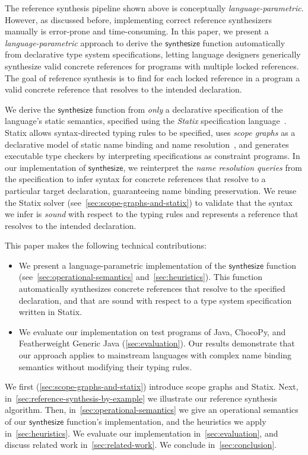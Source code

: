 The reference synthesis pipeline shown above is conceptually \emph{language-parametric}.
However, as discussed before, implementing correct reference synthesizers manually is error-prone and time-consuming.
In this paper, we present a \emph{language-parametric} approach to derive the $\mathsf{synthesize}$ function automatically from declarative type system specifications, letting language designers generically synthesize valid concrete references for programs with multiple locked references.
The goal of reference synthesis is to find for each locked reference in a program a valid concrete reference that resolves to the intended declaration.

We derive the $\mathsf{synthesize}$ function from \emph{only} a declarative specification of the language's static semantics, specified using the \emph{Statix} specification language~\cite{AntwerpenPRV18,RouvoetAPKV20}.
Statix allows syntax-directed typing rules to be specified, uses \emph{scope graphs} as a declarative model of static name binding and name resolution~\cite{NeronTVW15}, and generates executable type checkers by interpreting specifications as constraint programs.
In our implementation of $\mathsf{synthesize}$, we reinterpret the \emph{name resolution queries} from the specification to infer syntax for concrete references that resolve to a particular target declaration, guaranteeing name binding preservation.
We reuse the Statix solver (see~\cref{sec:scope-graphs-and-statix}) to validate that the syntax we infer is \emph{sound} with respect to the typing rules and represents a reference that resolves to the intended declaration.

This paper makes the following technical contributions:

\begin{itemize}

  \item
    We present a language-parametric implementation of the $\mathsf{synthesize}$ function (see~\cref{sec:operational-semantics} and~\cref{sec:heuristics}).
    This function automatically synthesizes concrete references that resolve to the specified declaration, and that are sound with respect to a type system specification written in Statix.

  \item 
    We evaluate our implementation on \allTotalTests{} test programs of Java, ChocoPy, and Featherweight Generic Java (\cref{sec:evaluation}).
    Our results demonstrate that our approach applies to mainstream languages with complex name binding semantics without modifying their typing rules.

\end{itemize}

\noindent
We first (\cref{sec:scope-graphs-and-statix}) introduce scope graphs and Statix.
Next, in~\cref{sec:reference-synthesis-by-example} we illustrate our reference synthesis algorithm.
Then, in~\cref{sec:operational-semantics} we give an operational semantics of our $\mathsf{synthesize}$ function's implementation, and the heuristics we apply in~\cref{sec:heuristics}.
We evaluate our implementation in~\cref{sec:evaluation}, and discuss related work in~\cref{sec:related-work}.
We conclude in~\cref{sec:conclusion}.

